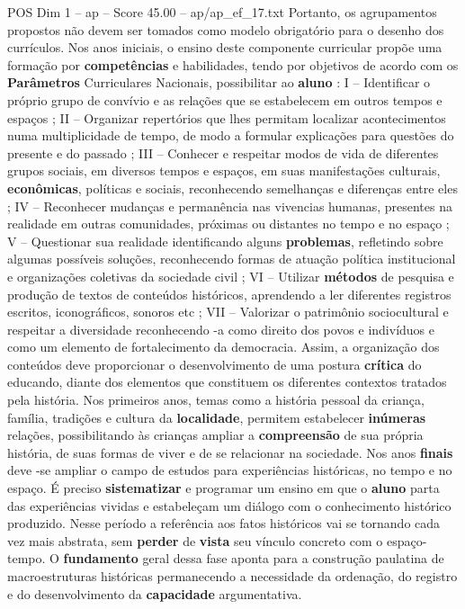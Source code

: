 \begin{textsample}{POS Dim 1 – ap – Score 45.00 – ap/ap\_ef\_17.txt}
Portanto, os agrupamentos propostos não devem ser tomados como modelo obrigatório para o desenho dos currículos.
Nos anos iniciais, o ensino deste componente curricular propõe uma formação por \textbf{competências} e habilidades, tendo por objetivos de acordo com os \textbf{Parâmetros} Curriculares Nacionais, possibilitar ao \textbf{aluno} : I – Identificar o próprio grupo de convívio e as relações que se estabelecem em outros tempos e espaços ; II – Organizar repertórios que lhes permitam localizar acontecimentos numa multiplicidade de tempo, de modo a formular explicações para questões do presente e do passado ; III – Conhecer e respeitar modos de vida de diferentes grupos sociais, em diversos tempos e espaços, em suas manifestações culturais, \textbf{econômicas}, políticas e sociais, reconhecendo semelhanças e diferenças entre eles ; IV – Reconhecer mudanças e permanência nas vivencias humanas, presentes na realidade em outras comunidades, próximas ou distantes no tempo e no espaço ; V – Questionar sua realidade identificando alguns \textbf{problemas}, refletindo sobre algumas possíveis soluções, reconhecendo formas de atuação política institucional e organizações coletivas da sociedade civil ; VI – Utilizar \textbf{métodos} de pesquisa e produção de textos de conteúdos históricos, aprendendo a ler diferentes registros escritos, iconográficos, sonoros etc ; VII – Valorizar o patrimônio sociocultural e respeitar a diversidade reconhecendo -a como direito dos povos e indivíduos e como um elemento de fortalecimento da democracia.
Assim, a organização dos conteúdos deve proporcionar o desenvolvimento de uma postura \textbf{crítica} do educando, diante dos elementos que constituem os diferentes contextos tratados pela história.
Nos primeiros anos, temas como a história pessoal da criança, família, tradições e cultura da \textbf{localidade}, permitem estabelecer \textbf{inúmeras} relações, possibilitando às crianças ampliar a \textbf{compreensão} de sua própria história, de suas formas de viver e de se relacionar na sociedade.
Nos anos \textbf{finais} deve -se ampliar o campo de estudos para experiências históricas, no tempo e no espaço.
É preciso \textbf{sistematizar} e programar um ensino em que o \textbf{aluno} parta das experiências vividas e estabeleçam um diálogo com o conhecimento histórico produzido.
Nesse período a referência aos fatos históricos vai se tornando cada vez mais abstrata, sem \textbf{perder} de \textbf{vista} seu vínculo concreto com o espaço-tempo.
O \textbf{fundamento} geral dessa fase aponta para a construção paulatina de macroestruturas históricas permanecendo a necessidade da ordenação, do registro e do desenvolvimento da \textbf{capacidade} argumentativa.

\end{textsample}
